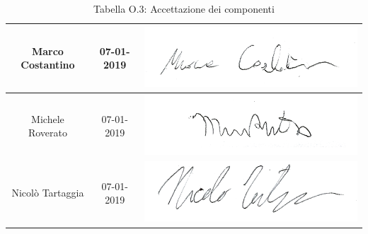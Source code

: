 \begin{table}[H]
\begin{center}
\begin{tabular}{| c | c | c |}
    Marco Costantino & 07-01-2019 & \includegraphics[align=c,scale=1]{Res/Firme/marco.png} \\ \hline
    Michele Roverato & 07-01-2019 & \includegraphics[align=c,scale=1]{Res/Firme/michele.png} \\ \hline
    Nicolò Tartaggia & 07-01-2019 & \includegraphics[align=c,scale=1]{Res/Firme/tartizz.png} \\ 
    \hline
  \end{tabular}
  \caption{Tabella O.3: Accettazione dei componenti\label{}}
\end{center}
\end{table}
\renewcommand{\arraystretch}{1}

